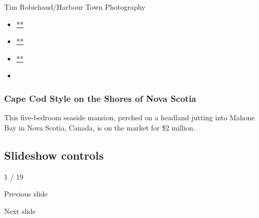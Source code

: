 Tim Robichaud/Harbour Town Photography

\begin{itemize}
\item
  \href{https://www.facebook.com/sharer.php?app_id=9869919170\&u=https\%3A\%2F\%2Fwww.nytimes.com\%2Fslideshow\%2F2020\%2F07\%2F29\%2Frealestate\%2Fcape-cod-style-on-the-shores-of-nova-scotia.html\%3Fsmid\%3Dfb-share\&name=Cape\%20Cod\%20Style\%20on\%20the\%20Shores\%20of\%20Nova\%20Scotia\&redirect_uri=https\%3A\%2F\%2Fwww.facebook.com\%2F}{**}
\item
  \href{https://twitter.com/intent/tweet?url=https\%3A\%2F\%2Fwww.nytimes.com\%2Fslideshow\%2F2020\%2F07\%2F29\%2Frealestate\%2Fcape-cod-style-on-the-shores-of-nova-scotia.html\%3Fsmid\%3Dtw-share\&text=Cape\%20Cod\%20Style\%20on\%20the\%20Shores\%20of\%20Nova\%20Scotia}{**}
\item
  \href{mailto:?subject=NYTimes.com\%3A\%20Cape\%20Cod\%20Style\%20on\%20the\%20Shores\%20of\%20Nova\%20Scotia\&body=From\%20The\%20New\%20York\%20Times\%3A\%0A\%0ACape\%20Cod\%20Style\%20on\%20the\%20Shores\%20of\%20Nova\%20Scotia\%0A\%0AThis\%20five-bedroom\%20seaside\%20mansion\%2C\%20perched\%20on\%20a\%20headland\%20jutting\%20into\%20Mahone\%20Bay\%20in\%20Nova\%20Scotia\%2C\%20Canada\%2C\%20is\%20on\%20the\%20market\%20for\%20\%242\%20million.\%0A\%0Ahttps\%3A\%2F\%2Fwww.nytimes.com\%2Fslideshow\%2F2020\%2F07\%2F29\%2Frealestate\%2Fcape-cod-style-on-the-shores-of-nova-scotia.html\%3Fsmid\%3Dem-share}{**}
\item
\end{itemize}

\hypertarget{cape-cod-style-on-the-shores-of-nova-scotia-1}{%
\subsubsection{Cape Cod Style on the Shores of Nova
Scotia}\label{cape-cod-style-on-the-shores-of-nova-scotia-1}}

This five-bedroom seaside mansion, perched on a headland jutting into
Mahone Bay in Nova Scotia, Canada, is on the market for \$2 million.

\hypertarget{slideshow-controls}{%
\subsection{Slideshow controls}\label{slideshow-controls}}

1 / 19

Previous slide

Next slide
